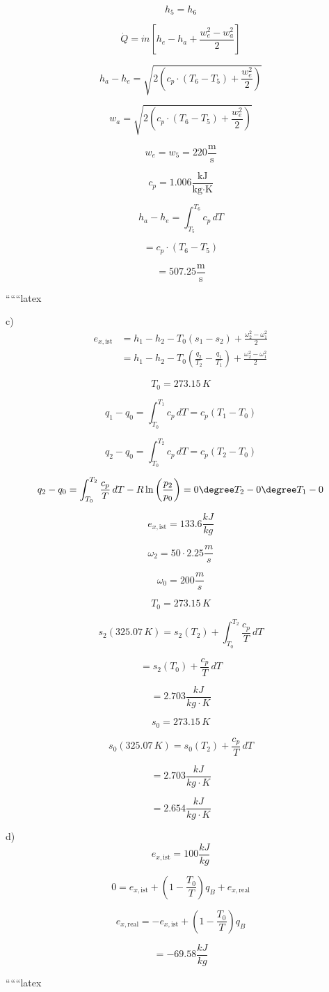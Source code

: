 
\[
h_5 = h_6
\]

\[
\dot{Q} = \dot{m} \left[ h_e - h_a + \frac{w_e^2 - w_a^2}{2} \right]
\]

\[
h_a - h_e = \sqrt{2 \left( c_p \cdot (T_6 - T_5) + \frac{w_e^2}{2} \right)}
\]

\[
w_a = \sqrt{2 \left( c_p \cdot (T_6 - T_5) + \frac{w_e^2}{2} \right)}
\]

\[
w_e = w_5 = 220 \frac{\text{m}}{\text{s}}
\]

\[
c_p = 1.006 \frac{\text{kJ}}{\text{kg} \cdot \text{K}}
\]

\[
h_a - h_e = \int_{T_5}^{T_6} c_p \, dT
\]

\[
= c_p \cdot (T_6 - T_5)
\]

\[
= 507.25 \frac{\text{m}}{\text{s}}
\]

``````latex


c)
\begin{align*}
e_{x, \text{ist}} &= h_1 - h_2 - T_0 (s_1 - s_2) + \frac{\omega_2^2 - \omega_1^2}{2} \\
&= h_1 - h_2 - T_0 \left( \frac{q_2}{T_2} - \frac{q_1}{T_1} \right) + \frac{\omega_2^2 - \omega_1^2}{2}
\end{align*}

\[
T_0 = 273.15 \, K
\]

\[
q_1 - q_0 = \int_{T_0}^{T_1} c_p \, dT = c_p (T_1 - T_0)
\]

\[
q_2 - q_0 = \int_{T_0}^{T_2} c_p \, dT = c_p (T_2 - T_0)
\]

\[
q_2 - q_0 = \int_{T_0}^{T_2} \frac{c_p}{T} \, dT - R \ln \left( \frac{p_2}{p_0} \right) = 0 \degree T_2 - 0 \degree T_1 - 0
\]

\[
e_{x, \text{ist}} = 133.6 \frac{kJ}{kg}
\]

\[
\omega_2 = 50 \cdot 2.25 \frac{m}{s}
\]

\[
\omega_0 = 200 \frac{m}{s}
\]

\[
T_0 = 273.15 \, K
\]

\[
s_2 (325.07 \, K) = s_2 (T_2) + \int_{T_0}^{T_2} \frac{c_p}{T} \, dT
\]

\[
= s_2 (T_0) + \frac{c_p}{T} \, dT
\]

\[
= 2.703 \frac{kJ}{kg \cdot K}
\]

\[
s_0 = 273.15 \, K
\]

\[
s_0 (325.07 \, K) = s_0 (T_2) + \frac{c_p}{T} \, dT
\]

\[
= 2.703 \frac{kJ}{kg \cdot K}
\]

\[
= 2.654 \frac{kJ}{kg \cdot K}
\]

d)
\[
e_{x, \text{ist}} = 100 \frac{kJ}{kg}
\]

\[
0 = e_{x, \text{ist}} + \left( 1 - \frac{T_0}{T} \right) q_B + e_{x, \text{real}}
\]

\[
e_{x, \text{real}} = -e_{x, \text{ist}} + \left( 1 - \frac{T_0}{T} \right) q_B
\]

\[
= -69.58 \frac{kJ}{kg}
\]

``````latex


